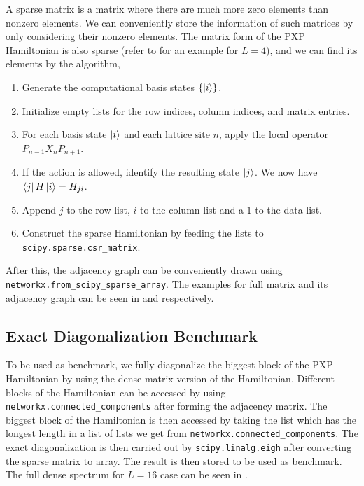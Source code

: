\documentclass[%
 reprint,
 amsmath,amssymb,
 aps,
]{revtex4-2}
\begin{document}
A sparse matrix is a matrix where there are much more zero elements than nonzero elements. We can conveniently store the information of such matrices by only considering their nonzero elements. The matrix form of the PXP Hamiltonian is also sparse (refer to  for an example for $L = 4$), and we can find its elements by the algorithm,

\begin{enumerate}
    \item Generate the computational basis states $\{\ket{i}\}$.
    \item Initialize empty lists for the row indices, column indices, and matrix entries.
    \item For each basis state $\ket{i}$ and each lattice site $n$, apply the local operator
    $P_{n-1}X_nP_{n+1}$.
    \item If the action is allowed, identify the resulting state $\ket{j}$. We now have $\bra{j}H\ket{i} = H_{ji}$.
    \item Append $j$ to the row list, $i$ to the column list and a $1$ to the data list.
    \item Construct the sparse Hamiltonian by feeding the lists to \texttt{scipy.sparse.csr\_matrix}.
\end{enumerate}

After this, the adjacency graph can be conveniently drawn using \texttt{networkx.from\_scipy\_sparse\_array}. The examples for full matrix and its adjacency graph can be seen in  and  respectively.

\subsection{\label{sec:exact_benchmark}Exact Diagonalization Benchmark}

To be used as benchmark, we fully diagonalize the biggest block of the PXP Hamiltonian by using the dense matrix version of the Hamiltonian. Different blocks of the Hamiltonian can be accessed by using \texttt{networkx.connected\_components} after forming the adjacency matrix. The biggest block of the Hamiltonian is then accessed by taking the list which has the longest length in a list of lists we get from \texttt{networkx.connected\_components}. The exact diagonalization is then carried out by \texttt{scipy.linalg.eigh} after converting the sparse matrix to array. The result is then stored to be used as benchmark. The full dense spectrum for $L = 16$ case can be seen in .
\end{document}
